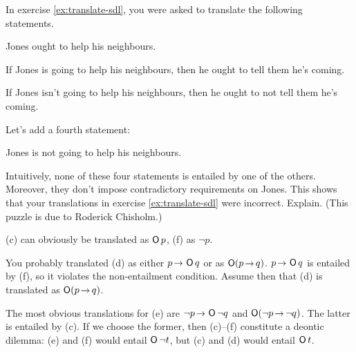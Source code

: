 \begin{exercise}\label{ex:chisholmsparadox}
  In exercise \ref{ex:translate-sdl}, you were asked to translate the following
  statements.
  \begin{exlist}
    \item[(c)] Jones ought to help his neighbours.
    \item[(d)] If Jones is going to help his neighbours, then he ought to tell them
    he's coming.
    \item[(e)] If Jones isn't going to help his neighbours, then he ought to not  tell them he's coming.
  \end{exlist}
  \medskip\noindent%
  Let's add a fourth statement:
  \begin{exlist}
    \item[(f)] Jones is not going to help his neighbours.
  \end{exlist}
  \medskip\noindent%
  Intuitively, none of these four statements is entailed by one of the others.
  Moreover, they don't impose contradictory requirements on Jones. This shows
  that your translations in exercise \ref{ex:translate-sdl} were incorrect.
  Explain. (This puzzle is due to Roderick Chisholm.)
\end{exercise}
\begin{solution}
  (c) can obviously be translated as $\operatorname{\mathsf{O}} p$, (f) as $\neg p$.

  You probably translated (d) as either $p \to \Ob q$ or as $\Ob(p \to q)$.
  $p \to \Ob q$ is entailed by (f), so it violates the non-entailment condition.
  Assume then that (d) is translated as $\Ob(p \to q)$.

  The most obvious translations for (e) are $\neg p \to \Ob\neg q$ and
  $\Ob(\neg p \to \neg q)$. The latter is entailed by (c). If we choose the
  former, then (c)--(f) constitute a deontic dilemma: (e) and (f) would entail
  $\operatorname{\mathsf{O}} \neg t$, but (c) and (d) would entail $\operatorname{\mathsf{O}} t$.
\end{solution}


